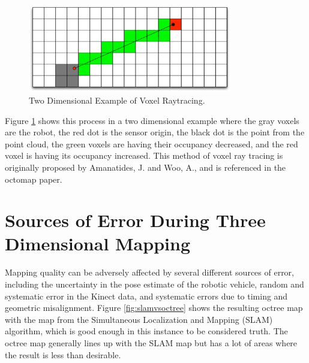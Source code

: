 \documentclass[12pt]{report}
\begin{document}
\begin{figure}[ht]
  \centering
  \includegraphics[width=3.5in,keepaspectratio]{raytrace.pdf}
  \caption{Two Dimensional Example of Voxel Raytracing.}
  \label{fig:voxel_raytrace}
\end{figure}

Figure \ref{fig:voxel_raytrace} shows this process in a two dimensional example where the gray voxels are the robot, the red dot is the sensor origin, the black dot is the point from the point cloud, the green voxels are having their occupancy decreased, and the red voxel is having its occupancy increased. This method of voxel ray tracing is originally proposed by Amanatides, J. and Woo, A., and is referenced in the octomap paper.\cite{amanatides1987fast}

\section{Sources of Error During Three Dimensional Mapping}
Mapping quality can be adversely affected by several different sources of error, including the uncertainty in the pose estimate of the robotic vehicle, random and systematic error in the Kinect data, and systematic errors due to timing and geometric misalignment.  Figure \ref{fig:slamvsoctree} shows the resulting octree map with the map from the Simultaneous Localization and Mapping (SLAM) algorithm, which is good enough in this instance to be considered truth. The octree map generally lines up with the SLAM map but has a lot of areas where the result is less than desirable.
\end{document}
